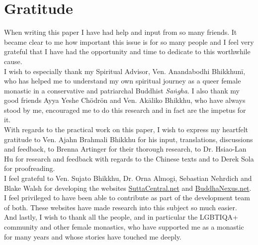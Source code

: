 \section{Gratitude}

When writing this paper I have had help and input from so many friends. It became clear to me how important this issue is for so many people and I feel very grateful that I have had the opportunity and time to dedicate to this worthwhile cause.\\

I wish to especially thank my Spiritual Advisor, Ven. Anandabodhi Bhikkhunī, who has helped me to understand my own spiritual journey as a queer female monastic in a conservative and patriarchal Buddhist {\em Saṅgha}. I also thank my good friends Ayya Yeshe Chödrön and Ven. Akāliko Bhikkhu, who have always stood by me, encouraged me to do this research and in fact are the impetus for it.\\

With regards to the practical work on this paper, I wish to express my heartfelt gratitude to Ven. Ajahn Brahmali Bhikkhu for his input, translations, discussions and feedback, to Brenna Artinger for their thorough research, to Dr. Hsiao-Lan Hu for research and feedback with regards to the Chinese texts and to Derek Sola for proofreading.\\

I feel grateful to Ven. Sujato Bhikkhu, Dr. Orna Almogi, Sebastian Nehrdich and Blake Walsh for developing the websites \href{https://suttacentral.net/}{SuttaCentral.net} and \href{https://buddhanexus.net/}{BuddhaNexus.net}. I feel privileged to have been able to contribute as part of the development team of both. These websites have made research into this subject so much easier.\\

And lastly, I wish to thank all the people, and in particular the LGBTIQA+ community and other female monastics, who have supported me as a monastic for many years and whose stories have touched me deeply.
